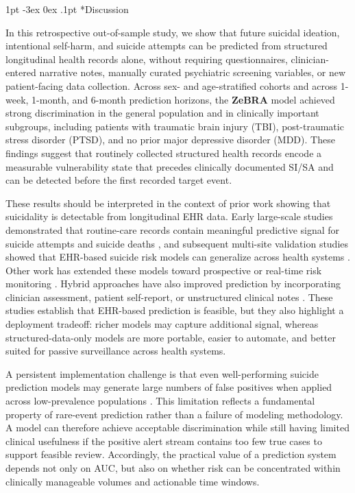 \documentclass[onecolumn, compsoc,11pt]{IEEEtran}
\makeatletter
\def\zebra{\textbf{ZeBRA}\xspace}
\renewcommand\section{\@startsection {section}{1}{\z@}
  {1pt \@plus -3ex \@minus 0ex}
  {.1pt}
  {\large\bfseries\scshape\color{black!70}}}
\def\zebra{\textbf{ZeBRA}\xspace}
\makeatother
\begin{document}
\section*{Discussion}

In this retrospective out-of-sample study, we show that future suicidal ideation, intentional self-harm, and suicide attempts can be predicted from structured longitudinal health records alone, without requiring questionnaires, clinician-entered narrative notes, manually curated psychiatric screening variables, or new patient-facing data collection. Across sex- and age-stratified cohorts and across 1-week, 1-month, and 6-month prediction horizons, the \zebra model achieved strong discrimination in the general population and in clinically important subgroups, including patients with traumatic brain injury (TBI), post-traumatic stress disorder (PTSD), and no prior major depressive disorder (MDD). These findings suggest that routinely collected structured health records encode a measurable vulnerability state that precedes clinically documented SI/SA and can be detected before the first recorded target event.

These results should be interpreted in the context of prior work showing that suicidality is detectable from longitudinal EHR data. Early large-scale studies demonstrated that routine-care records contain meaningful predictive signal for suicide attempts and suicide deaths \cite{simon2018predicting,barakcorren2017}, and subsequent multi-site validation studies showed that EHR-based suicide risk models can generalize across health systems \cite{barakcorren2020,barakcorren2020validation}. Other work has extended these models toward prospective or real-time risk monitoring \cite{walsh2017,walsh2021,walsh2021predicting}. Hybrid approaches have also improved prediction by incorporating clinician assessment, patient self-report, or unstructured clinical notes \cite{nock2022,tsui2021natural,tsui2021,obeid2020identifying}. These studies establish that EHR-based prediction is feasible, but they also highlight a deployment tradeoff: richer models may capture additional signal, whereas structured-data-only models are more portable, easier to automate, and better suited for passive surveillance across health systems.

A persistent implementation challenge is that even well-performing suicide prediction models may generate large numbers of false positives when applied across low-prevalence populations \cite{belsher2019prediction}. This limitation reflects a fundamental property of rare-event prediction rather than a failure of modeling methodology. A model can therefore achieve acceptable discrimination while still having limited clinical usefulness if the positive alert stream contains too few true cases to support feasible review. Accordingly, the practical value of a prediction system depends not only on AUC, but also on whether risk can be concentrated within clinically manageable volumes and actionable time windows.
\end{document}

